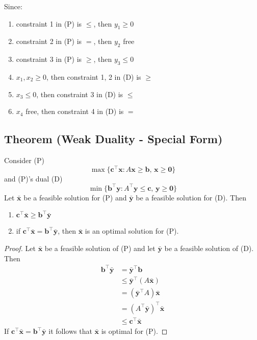 Since:
\begin{enumerate}
    \item constraint 1 in (P) is $\le$, then $y_1 \ge 0$
    \item constraint 2 in (P) is $=$, then $y_2$ free
    \item constraint 3 in (P) is $\ge$, then $y_3 \le 0$
    \item $x_1,x_2\ge 0$, then constraint 1, 2 in (D) is $\ge$
    \item $x_3\le 0$, then constraint 3 in (D) is $\le$
    \item $x_4$ free, then constraint 4 in (D) is $=$
\end{enumerate}


\begin{thmbox}
    \subsection{Theorem (Weak Duality - Special Form)}
    Consider (P)
    \[ \max \{\bm{c}^{\top} \bm{x}: A \bm{x} \geq \bm{b},\, \bm{x} \geq \bm{0}\} \]
    and (P)'s dual (D)
    \[ \min \{\bm{b}^{\top} \bm{y}: A^{\top} \bm{y} \leq \bm{c},\, \bm{y} \geq \bm{0}\}\]
    Let $ \bm{\bar{x}} $ be a feasible solution for (P) and $ \bm{\bar{y}} $
    be a feasible solution for (D). Then
    \begin{enumerate}[(1)]
        \item $ \bm{c}^\top \bm{\bar{x}}\ge \bm{b}^\top \bm{\bar{y}} $
        \item if $ \bm{c}^\top \bm{\bar{x}}=\bm{b}^\top \bm{\bar{y}} $, then
        $ \bm{\bar{x}} $ is an optimal solution for (P).
    \end{enumerate}
\end{thmbox}
\begin{proof}
    Let $ \bm{\bar{x}} $ be a feasible solution of (P) and let $ \bm{\bar{y}} $
    be a feasible solution of (D). Then
    \begin{align*}
        \bm{b}^\top \bm{\bar{y}}&=\bm{\bar{y}}^\top \bm{b}\\
        &\le \bm{\bar{y}}^\top(A \bm{\bar{x}})\\
        &=(\bm{\bar{y}}^\top A) \bm{\bar{x}}\\
        &=(A ^\top \bm{\bar{y}})^\top \bm{\bar{x}}\\
        &\le \bm{c}^\top \bm{\bar{x}} 
    \end{align*}
    If $ \bm{c}^\top \bm{\bar{x}}=\bm{b}^\top \bm{\bar{y}} $ it follows
    that $ \bm{\bar{x}} $ is optimal for (P).
\end{proof}

